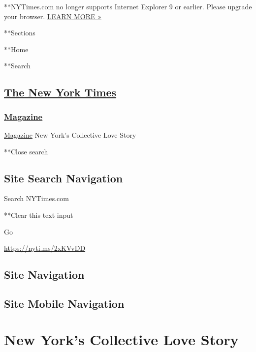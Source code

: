  **NYTimes.com no longer supports Internet Explorer 9 or earlier. Please
upgrade your browser.
\href{http://www.nytimes3xbfgragh.onion/content/help/site/ie9-support.html}{LEARN
MORE »}

**Sections

**Home

**Search

\hypertarget{the-new-york-times}{%
\subsection{\texorpdfstring{\href{http://www.nytimes3xbfgragh.onion/}{The
New York Times}}{The New York Times}}\label{the-new-york-times}}

\hypertarget{-magazine-}{%
\subsubsection{\texorpdfstring{
\href{https://www.nytimes3xbfgragh.onion/section/magazine}{Magazine}
}{ Magazine }}\label{-magazine-}}

 \href{https://www.nytimes3xbfgragh.onion/section/magazine}{Magazine}
\textbar{}New York's Collective Love Story

**Close search

\hypertarget{site-search-navigation}{%
\subsection{Site Search Navigation}\label{site-search-navigation}}

Search NYTimes.com

**Clear this text input

Go

\url{https://nyti.ms/2xKVvDD}

\hypertarget{site-navigation}{%
\subsection{Site Navigation}\label{site-navigation}}

\hypertarget{site-mobile-navigation}{%
\subsection{Site Mobile Navigation}\label{site-mobile-navigation}}

\hypertarget{new-yorks-collective-love-story}{%
\section{New York's Collective Love
Story}\label{new-yorks-collective-love-story}}

